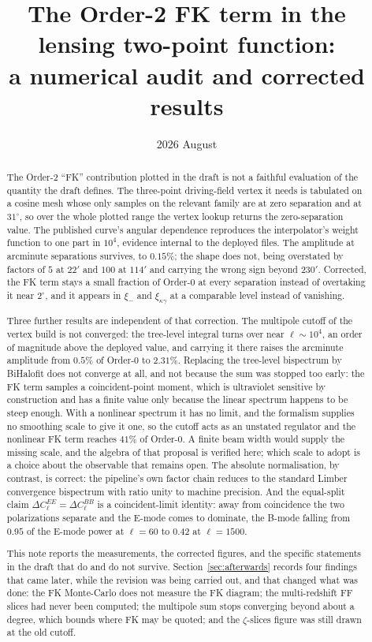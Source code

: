 \documentclass[11pt,a4paper]{article}
\title{\bf The Order-2 FK term in the lensing two-point function:\\
a numerical audit and corrected results}
\author{}
\date{2026 August}
\begin{document}
\maketitle

\begin{abstract}
\noindent
The Order-2 ``FK'' contribution plotted in the draft is not a faithful
evaluation of the quantity the draft defines. The three-point driving-field
vertex it needs is tabulated on a cosine mesh whose only samples on the
relevant family are at zero separation and at $31^\circ$, so over the whole
plotted range the vertex lookup returns the zero-separation value. The
published curve's angular dependence reproduces the interpolator's weight
function to one part in $10^4$, evidence internal to the deployed files.
The amplitude at arcminute separations survives, to $0.15\%$; the shape does
not, being overstated by factors of $5$ at $22'$ and $100$ at $114'$ and
carrying the wrong sign beyond $230'$. Corrected, the FK term stays a small
fraction of Order-0 at every separation instead of overtaking it near
$2^\circ$, and it appears in $\xi_-$ and $\xi_{\kappa\gamma}$ at a
comparable level instead of vanishing.

Three further results are independent of that correction. The multipole
cutoff of the vertex build is not converged: the tree-level integral turns
over near $\ell\sim10^4$, an order of magnitude above the deployed value,
and carrying it there raises the arcminute amplitude from $0.5\%$ of
Order-0 to $2.31\%$. Replacing the tree-level bispectrum by BiHalofit
does not converge at all, and not because the sum was stopped too early:
the FK term samples a coincident-point moment, which is ultraviolet
sensitive by construction and has a finite value only because the linear
spectrum happens to be steep enough. With a nonlinear spectrum it has no
limit, and the formalism supplies no smoothing scale to give it one, so the
cutoff acts as an unstated regulator and the nonlinear FK term reaches
$41\%$ of Order-0. A finite beam width would supply the missing scale, and
the algebra of that proposal is verified here; which scale to adopt is a
choice about the observable that remains open. The absolute
normalisation, by contrast, is correct: the pipeline's own factor chain
reduces to the standard Limber convergence bispectrum with ratio unity to
machine precision. And the equal-split claim
$\Delta C_\ell^{EE}=\Delta C_\ell^{BB}$ is a coincident-limit identity:
away from coincidence the two polarizations separate and the E-mode comes to
dominate, the B-mode falling from $0.95$ of the E-mode power at $\ell=60$ to
$0.42$ at $\ell=1500$.

This note reports the measurements, the corrected figures, and the specific
statements in the draft that do and do not survive.
Section~\ref{sec:afterwards} records four findings that came later, while the
revision was being carried out, and that changed what was done: the FK
Monte-Carlo does not measure the FK diagram; the multi-redshift FF slices had
never been computed; the multipole sum stops converging beyond about a degree,
which bounds where FK may be quoted; and the $\zeta$-slices figure was still
drawn at the old cutoff.
\end{abstract}

\tableofcontents














\end{document}
